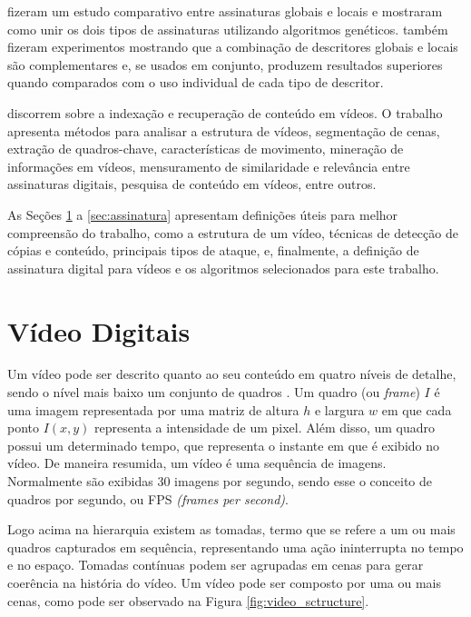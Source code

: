  fizeram um estudo comparativo entre assinaturas globais e locais e mostraram como unir os dois tipos de assinaturas utilizando algoritmos genéticos.  também fizeram experimentos mostrando que a combinação de descritores globais e locais são complementares e, se usados em conjunto, produzem resultados superiores quando comparados com o uso individual de cada tipo de descritor.

 discorrem sobre a indexação e recuperação de conteúdo em vídeos. O trabalho apresenta métodos para analisar a estrutura de vídeos, segmentação de cenas, extração de quadros-chave, características de movimento, mineração de informações em vídeos, mensuramento de similaridade e relevância entre assinaturas digitais, pesquisa de conteúdo em vídeos, entre outros.

As Seções \ref{sec:video} a \ref{sec:assinatura} apresentam definições úteis para melhor compreensão do trabalho, como a estrutura de um vídeo, técnicas de detecção de cópias e conteúdo,  principais tipos de ataque, e, finalmente, a definição de assinatura digital para vídeos e os algoritmos selecionados para este trabalho.

\section{Vídeo Digitais}
\label{sec:video}  

	Um vídeo pode ser descrito quanto ao seu conteúdo em quatro níveis de detalhe, sendo o nível mais baixo um conjunto de quadros \cite{lienhart1997video}. Um quadro (ou \textit{frame}) $I$ é uma imagem representada por uma matriz de altura $h$ e largura $w$ em que cada ponto $I(x,y)$ representa a intensidade de um pixel. Além disso, um quadro possui um determinado tempo, que representa o instante em que é exibido no vídeo. De maneira resumida, um vídeo é uma sequência de imagens. Normalmente são exibidas 30 imagens por segundo, sendo esse o conceito de quadros por segundo, ou FPS \textit{(frames per second)}. 

	Logo acima na hierarquia existem as tomadas, termo que se refere a um ou mais quadros capturados em sequência, representando uma ação ininterrupta no tempo e no espaço. Tomadas contínuas podem ser agrupadas em cenas para gerar coerência na história do vídeo. Um vídeo pode ser composto por uma ou mais cenas, como pode ser observado na Figura \ref{fig:video_sctructure}.
    
